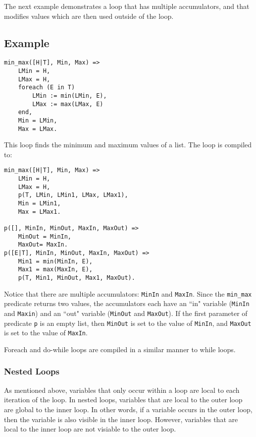 The next example demonstrates a loop that has multiple accumulators, and that modifies values which are then used outside of the loop.
\subsection*{Example}
\begin{verbatim}
min_max([H|T], Min, Max) =>
    LMin = H,
    LMax = H,
    foreach (E in T)
        LMin := min(LMin, E),
        LMax := max(LMax, E)
    end,
    Min = LMin,
    Max = LMax.
\end{verbatim}

This loop finds the minimum and maximum values of a list.  The loop is compiled to:
\begin{verbatim}
min_max([H|T], Min, Max) =>
    LMin = H,
    LMax = H,
    p(T, LMin, LMin1, LMax, LMax1),
    Min = LMin1,
    Max = LMax1.

p([], MinIn, MinOut, MaxIn, MaxOut) =>
    MinOut = MinIn,
    MaxOut= MaxIn.
p([E|T], MinIn, MinOut, MaxIn, MaxOut) =>
    Min1 = min(MinIn, E),
    Max1 = max(MaxIn, E),
    p(T, Min1, MinOut, Max1, MaxOut).
\end{verbatim}
Notice that there are multiple accumulators: \texttt{MinIn} and \texttt{MaxIn}.  Since the \texttt{min\_max} predicate returns two values, the accumulators each have an ``in" variable (\texttt{MinIn} and \texttt{Maxin}) and an ``out" variable (\texttt{MinOut} and \texttt{MaxOut}).   If the first parameter of predicate \texttt{p} is an empty list, then \texttt{MinOut} is set to the value of \texttt{MinIn}, and \texttt{MaxOut} is set to the value of \texttt{MaxIn}.

Foreach and do-while loops are compiled in a similar manner to while loops.

\subsubsection{Nested Loops}
As mentioned above, variables that only occur within a loop are local to each iteration of the loop.  In nested loops, variables that are local to the outer loop are global to the inner loop.  In other words, if a variable occurs in the outer loop, then the variable is also visible in the inner loop.  However, variables that are local to the inner loop are not visiable to the outer loop.

